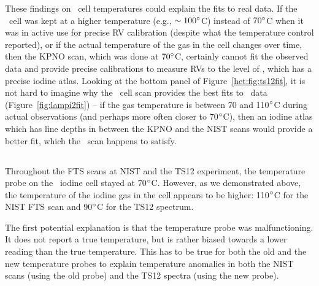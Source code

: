 These findings on \het\ cell temperatures could explain the fits to
real data. If the \het\ cell was kept at a higher temperature (e.g.,
$\sim 100^{\circ}$C) instead of $70^{\circ}$C when it was in active use
for precise RV calibration (despite what the temperature control
reported), or if the actual temperature of the gas in the cell changes
over time, then the KPNO scan, which was done at $70^{\circ}$C,
certainly cannot fit the observed data and provide precise
calibrations to measure RVs to the level of \keck, which has a precise
iodine atlas. Looking at the bottom panel of
Figure~\ref{het:fig:ts12fit}, it is not hard to imagine why the \keck\
cell scan provides the best fits to \het\ data
(Figure~\ref{fig:lampi2fit}) -- if the gas temperature is between 70
and 110$^{\circ}$C during actual observations (and perhaps more often
closer to 70$^{\circ}$C), then an iodine atlas which has line depths in
between the KPNO and the NIST scans would provide a better fit, which
the \keck\ scan happens to satisfy.



\subsection{\rev{Cause for A Higher Iodine Gas Temperature}}

Throughout the FTS scans at NIST and the TS12 experiment, the
temperature probe on the \het\ iodine cell stayed at
70$^{\circ}$C. However, as we demonstrated above, the temperature of
the iodine gas in the cell appears to be higher: 110$^{\circ}$C for the
NIST FTS scan and 90$^{\circ}$C for the TS12 spectrum.

The first potential explanation is that the temperature probe was
malfunctioning. It does not report a true temperature, but is rather
biased towards a lower reading than the true temperature. This has to
be true for both the old and the new temperature probes to explain
temperature anomalies in both the NIST scans (using the old probe) and
the TS12 spectra (using the new probe).

